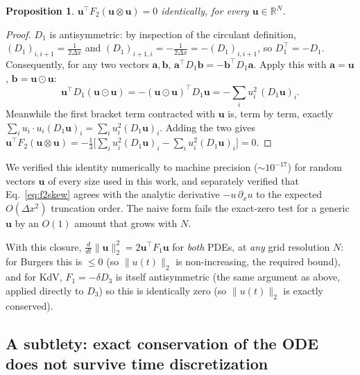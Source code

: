 \documentclass[aps,pra,twocolumn,notitlepage,superscriptaddress,floatfix,10pt]{revtex4-2}
\newtheorem{proposition}{Proposition}
\newcommand{\norm}[1]{\lVert #1 \rVert}
\newcommand{\R}{\mathbb{R}}
\begin{document}
\begin{proposition}
$\bm u^{\!\top} F_2(\bm u\otimes\bm u) = 0$ identically, for every $\bm u\in\R^N$.
\end{proposition}
\begin{proof}
$D_1$ is antisymmetric: by inspection of the circulant definition, $(D_1)_{i,i+1}=\tfrac1{2\Delta x}$
and $(D_1)_{i+1,i}=-\tfrac1{2\Delta x}=-(D_1)_{i,i+1}$, so $D_1^{\!\top}=-D_1$. Consequently, for any
two vectors $\bm a,\bm b$, $\bm a^{\!\top}D_1\bm b=-\bm b^{\!\top}D_1\bm a$. Apply this with
$\bm a=\bm u$, $\bm b=\bm u\!\odot\!\bm u$:
\begin{equation}
\bm u^{\!\top}D_1(\bm u\!\odot\!\bm u) = -(\bm u\!\odot\!\bm u)^{\!\top}D_1\bm u
= -\sum_i u_i^2\,(D_1\bm u)_i.
\end{equation}
Meanwhile the first bracket term contracted with $\bm u$ is, term by term, exactly
$\sum_i u_i\cdot u_i(D_1\bm u)_i=\sum_iu_i^2(D_1\bm u)_i$. Adding the two gives
$\bm u^{\!\top}F_2(\bm u\otimes\bm u)=-\tfrac13\big[\sum_iu_i^2(D_1\bm u)_i-\sum_iu_i^2(D_1\bm u)_i\big]=0$.
\end{proof}
We verified this identity numerically to machine precision ($\sim10^{-17}$) for random vectors $\bm u$
of every size used in this work, and separately verified that Eq.~\eqref{eq:f2skew} agrees with the
analytic derivative $-u\,\partial_xu$ to the expected $O(\Delta x^2)$ truncation order. The naive form
fails the exact-zero test for a generic $\bm u$ by an $O(1)$ amount that grows with $N$.

With this closure, $\frac{d}{dt}\norm{\bm u}_2^2=2\bm u^{\!\top}F_1\bm u$ for \emph{both} PDEs, at
\emph{any} grid resolution $N$: for Burgers this is $\le0$ (so $\norm{u(t)}_2$ is non-increasing, the
required bound), and for KdV, $F_1=-\delta D_3$ is itself antisymmetric (the same argument as above,
applied directly to $D_3$) so this is identically zero (so $\norm{u(t)}_2$ is exactly conserved).

\subsection{A subtlety: exact conservation of the ODE does not survive time discretization}
\label{sec:forward-euler-injects-energy}
\end{document}
